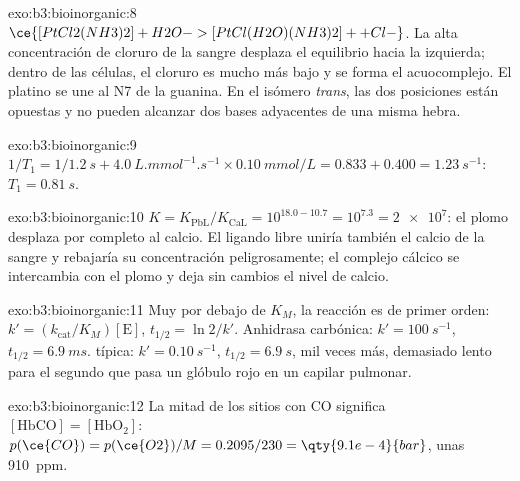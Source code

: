 \begin{solution}{exo:b3:bioinorganic:8}
$\ce{[PtCl2(NH3)2] + H2O -> [PtCl(H2O)(NH3)2]+ + Cl-}$. La alta concentración de cloruro de la sangre
desplaza el equilibrio hacia la izquierda; dentro de las células, el cloruro es mucho más bajo y se forma el
acuocomplejo. El platino se une al N7 de la guanina. En el isómero \textit{trans}, las dos
posiciones  están opuestas y no pueden alcanzar dos bases adyacentes de una misma
hebra.
\end{solution}

\begin{solution}{exo:b3:bioinorganic:9}
$1/T_1 = 1/\qty{1.2}{s} + \qty{4.0}{L.mmol^{-1}.s^{-1}} \times \qty{0.10}{mmol/L} = 0.833 + 0.400 = \qty{1.23}{s^{-1}}$: $T_1 = \qty{0.81}{s}$.
\end{solution}

\begin{solution}{exo:b3:bioinorganic:10}
$K = K_{\mathrm{PbL}}/K_{\mathrm{CaL}} = 10^{18.0 - 10.7} = 10^{7.3} = \num{2e7}$: el plomo desplaza por completo al calcio. El ligando
libre uniría también el calcio de la sangre y rebajaría su concentración
peligrosamente; el complejo cálcico se intercambia con el plomo y deja sin cambios el nivel
de calcio.
\end{solution}

\begin{solution}{exo:b3:bioinorganic:11}
Muy por debajo de $K_M$, la reacción es de primer orden: $k' = (k_{\mathrm{cat}}/K_M)[\mathrm E]$, $t_{1/2} = \ln 2/k'$. Anhidrasa
carbónica: $k' = \qty{100}{s^{-1}}$, $t_{1/2} = \qty{6.9}{ms}$.  típica: $k' = \qty{0.10}{s^{-1}}$, $t_{1/2} = \qty{6.9}{s}$, mil
veces más, demasiado lento para el segundo que pasa un glóbulo rojo en un capilar pulmonar.
\end{solution}

\begin{solution}{exo:b3:bioinorganic:12}
La mitad de los sitios con CO significa $[\mathrm{HbCO}] = [\mathrm{HbO_2}]$: $p(\ce{CO}) = p(\ce{O2})/M = 0.2095/230 = \qty{9.1e-4}{bar}$, unas
\qty{910}{ppm}.
\end{solution}

